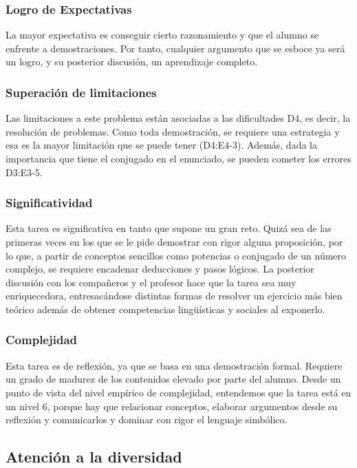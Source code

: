 \documentclass[../main.tex]{memoir}
\begin{document}
\subsubsection{Logro de Expectativas}
La mayor expectativa es conseguir cierto razonamiento y que el alumno se enfrente a demostraciones. Por tanto, cualquier argumento que se esboce ya será un logro, y su posterior discusión, un aprendizaje completo. 

\subsubsection{Superación de limitaciones}
Las limitaciones a este problema están asociadas a las dificultades D4, es decir, la resolución de problemas. Como toda demostración, se requiere una estrategia y esa es la mayor limitación que se puede tener (D4:E4-3). Además, dada la importancia que tiene el conjugado en el enunciado, se pueden cometer los errores D3:E3-5.

\subsubsection{Significatividad}
Esta tarea es significativa en tanto que supone un gran reto. Quizá sea de las primeras veces en los que se le pide demostrar con rigor alguna proposición, por lo que, a partir de conceptos sencillos como potencias o conjugado de un número complejo, se requiere encadenar deducciones y pasos lógicos. La posterior discusión con los compañeros y el profesor hace que la tarea sea muy enriquecedora, entresacándose distintas formas de resolver un ejercicio más bien teórico además de obtener competencias lingüísticas y sociales al exponerlo.

\subsubsection{Complejidad}
Esta tarea es de reflexión, ya que se basa en una demostración formal. Requiere un grado de madurez de los contenidos elevado por parte del alumno. Desde un punto de vista del nivel empírico de complejidad, entendemos que la tarea está en un nivel 6, porque hay que relacionar conceptos, elaborar argumentos desde su reflexión y comunicarlos y dominar con rigor el lenguaje simbólico. 


\subsection{Atención a la diversidad}
\end{document}
